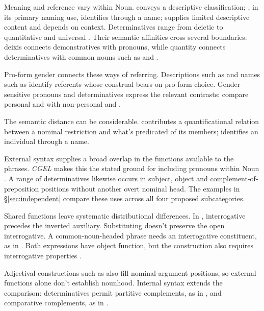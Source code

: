 \documentclass[12pt]{article}
\begin{document}
Meaning and reference vary within Noun.  conveys a descriptive classification; , in its primary naming use, identifies through a name;  supplies limited descriptive content and depends on context. Determinatives range from deictic  to quantitative  and universal  \citep[358--360, 370--405, 425--428, 515--521]{huddleston2002}. Their semantic affinities cross several boundaries: deixis connects demonstratives with pronouns, while quantity connects determinatives with common nouns such as  and .

Pro-form gender connects these ways of referring. Descriptions such as  and names such as  identify referents whose construal bears on pro-form choice. Gender-sensitive pronouns and determinatives express the relevant contrasts: compare personal  and  with non-personal  and  \citep{reynolds2025proformgender}.

The semantic distance can be considerable.  contributes a quantificational relation between a nominal restriction and what's predicated of its members;  identifies an individual through a name.

External syntax supplies a broad overlap in the functions available to the phrases. \textit{CGEL} makes this the stated ground for including pronouns within Noun \citep[327]{huddleston2002}. A range of determinatives likewise occurs in subject, object and complement-of-preposition positions without another overt nominal head. The examples in §\ref{sec:independent} compare these uses across all four proposed subcategories.

Shared functions leave systematic distributional differences. In , interrogative  precedes the inverted auxiliary. Substituting  doesn't preserve the open interrogative. A common-noun-headed phrase needs an interrogative constituent, as in . Both expressions have object function, but the construction also requires interrogative properties \citep[Ch.~10, §§7.1, 7.9]{huddleston2002}.

Adjectival constructions such as  also fill nominal argument positions, so external functions alone don't establish nounhood. Internal syntax extends the comparison: determinatives permit partitive complements, as in , and comparative complements, as in  \citep[392--394, 411--412, 432--433]{huddleston2002}.
\end{document}
